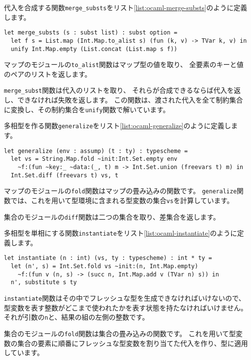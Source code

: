 代入を合成する関数\texttt{merge\_substs}をリスト\ref{list:ocaml-merge-substs}のように定義します。

\begin{lstlisting}[caption=代入の合成, label=list:ocaml-merge-substs]
let merge_substs (s : subst list) : subst option =
  let f s = List.map (Int.Map.to_alist s) (fun (k, v) -> TVar k, v) in
  unify Int.Map.empty (List.concat (List.map s f))
\end{lstlisting}

マップのモジュールの\texttt{to\_alist}関数はマップ型の値を取り、
全要素のキーと値のペアのリストを返します。

\texttt{merge\_subst}関数は代入のリストを取り、
それらが合成できるならば代入を返し、できなければ失敗を返します。
この関数は、渡された代入を全て制約集合に変換し、その制約集合を\texttt{unify}関数で解いています。

多相型を作る関数\texttt{generalize}をリスト\ref{list:ocaml-generalize}のように定義します。

\begin{lstlisting}[caption=多相型を作る, label=list:ocaml-generalize]
let generalize (env : assump) (t : ty) : typescheme =
  let vs = String.Map.fold ~init:Int.Set.empty env
    ~f:(fun ~key:_ ~data:(_, t) m -> Int.Set.union (freevars t) m) in
  Int.Set.diff (freevars t) vs, t
\end{lstlisting}

マップのモジュールの\texttt{fold}関数はマップの畳み込みの関数です。
\texttt{generalize}関数では、これを用いて型環境に含まれる型変数の集合\texttt{vs}を計算しています。

集合のモジュールの\texttt{diff}関数は二つの集合を取り、差集合を返します。

多相型を単相にする関数\texttt{instantiate}をリスト\ref{list:ocaml-instantiate}のように定義します。

\begin{lstlisting}[caption=多相型を単相にする, label=list:ocaml-instantiate]
let instantiate (n : int) (vs, ty : typescheme) : int * ty =
  let (n', s) = Int.Set.fold vs ~init:(n, Int.Map.empty)
    ~f:(fun v (n, s) -> (succ n, Int.Map.add v (TVar n) s)) in
  n', substitute s ty
\end{lstlisting}

\texttt{instantiate}関数はその中でフレッシュな型を生成できなければいけないので、
型変数を表す整数がどこまで使われたかを表す状態を持たなければいけません。
それが引数の\texttt{n}と、結果の組の左側の整数です。

集合のモジュールの\texttt{fold}関数は集合の畳み込みの関数です。
これを用いて型変数の集合の要素に順番にフレッシュな型変数を割り当てた代入を作り、型に適用しています。

